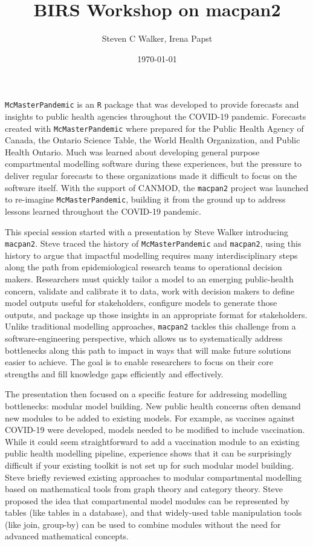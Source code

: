 \documentclass{article}
\title{BIRS Workshop on macpan2}
\date{\today}
\author{Steven C Walker, Irena Papst}
\newcommand{\macpan}{\texttt{macpan2}\xspace}
\newcommand{\macpanOrig}{\texttt{McMasterPandemic}\xspace}
\newcommand{\R}{\texttt{R}\xspace}
\begin{document}
  \maketitle

  \macpanOrig is an \R package that was developed to provide forecasts and insights to public health agencies throughout the COVID-19 pandemic. Forecasts created with \macpanOrig where prepared for the Public Health Agency of Canada, the Ontario Science Table, the World Health Organization, and Public Health Ontario. Much was learned about developing general purpose compartmental modelling software during these experiences, but the pressure to deliver regular forecasts to these organizations made it difficult to focus on the software itself. With the support of CANMOD, the \macpan project was launched to re-imagine \macpanOrig, building it from the ground up to address lessons learned throughout the COVID-19 pandemic.

  This special session started with a presentation by Steve Walker introducing \macpan. Steve traced the history of \macpanOrig and \macpan, using this history to argue that impactful modelling requires many interdisciplinary steps along the path from epidemiological research teams to operational decision makers. Researchers must quickly tailor a model to an emerging public-health concern, validate and calibrate it to data, work with decision makers to define model outputs useful for stakeholders, configure models to generate those outputs, and package up those insights in an appropriate format for stakeholders. Unlike traditional modelling approaches, \macpan tackles this challenge from a software-engineering perspective, which allows us to systematically address bottlenecks along this path to impact in ways that will make future solutions easier to achieve. The goal is to enable researchers to focus on their core strengths and fill knowledge gaps efficiently and effectively.

  The presentation then focused on a specific feature for addressing modelling bottlenecks: modular model building. New public health concerns often demand new modules to be added to existing models. For example, as vaccines against COVID-19 were developed, models needed to be modified to include vaccination. While it could seem straightforward to add a vaccination module to an existing public health modelling pipeline, experience shows that it can be surprisingly difficult if your existing toolkit is not set up for such modular model building. Steve briefly reviewed existing approaches to modular compartmental modelling based on mathematical tools from graph theory and category theory. Steve proposed the idea that compartmental model modules can be represented by tables (like tables in a database), and that widely-used table manipulation tools (like join, group-by) can be used to combine modules without the need for advanced mathematical concepts.
\end{document}
